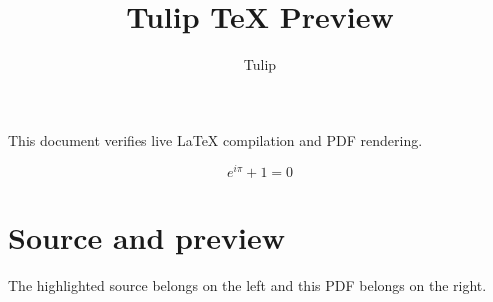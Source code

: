 \documentclass{article}
\title{Tulip TeX Preview}
\author{Tulip}
\begin{document}
\maketitle

This document verifies live \LaTeX{} compilation and PDF rendering.

\[
  e^{i\pi} + 1 = 0
\]

\section{Source and preview}
The highlighted source belongs on the left and this PDF belongs on the right.
\end{document}
